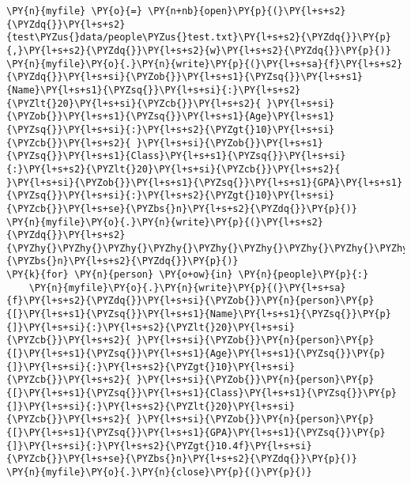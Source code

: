 \begin{tcolorbox}[breakable, size=fbox, boxrule=1pt, pad at break*=1mm,colback=cellbackground, colframe=cellborder]
\begin{Verbatim}[commandchars=\\\{\}]
\PY{n}{myfile} \PY{o}{=} \PY{n+nb}{open}\PY{p}{(}\PY{l+s+s2}{\PYZdq{}}\PY{l+s+s2}{test\PYZus{}data/people\PYZus{}test.txt}\PY{l+s+s2}{\PYZdq{}}\PY{p}{,}\PY{l+s+s2}{\PYZdq{}}\PY{l+s+s2}{w}\PY{l+s+s2}{\PYZdq{}}\PY{p}{)}
\PY{n}{myfile}\PY{o}{.}\PY{n}{write}\PY{p}{(}\PY{l+s+sa}{f}\PY{l+s+s2}{\PYZdq{}}\PY{l+s+si}{\PYZob{}}\PY{l+s+s1}{\PYZsq{}}\PY{l+s+s1}{Name}\PY{l+s+s1}{\PYZsq{}}\PY{l+s+si}{:}\PY{l+s+s2}{\PYZlt{}20}\PY{l+s+si}{\PYZcb{}}\PY{l+s+s2}{ }\PY{l+s+si}{\PYZob{}}\PY{l+s+s1}{\PYZsq{}}\PY{l+s+s1}{Age}\PY{l+s+s1}{\PYZsq{}}\PY{l+s+si}{:}\PY{l+s+s2}{\PYZgt{}10}\PY{l+s+si}{\PYZcb{}}\PY{l+s+s2}{ }\PY{l+s+si}{\PYZob{}}\PY{l+s+s1}{\PYZsq{}}\PY{l+s+s1}{Class}\PY{l+s+s1}{\PYZsq{}}\PY{l+s+si}{:}\PY{l+s+s2}{\PYZlt{}20}\PY{l+s+si}{\PYZcb{}}\PY{l+s+s2}{ }\PY{l+s+si}{\PYZob{}}\PY{l+s+s1}{\PYZsq{}}\PY{l+s+s1}{GPA}\PY{l+s+s1}{\PYZsq{}}\PY{l+s+si}{:}\PY{l+s+s2}{\PYZgt{}10}\PY{l+s+si}{\PYZcb{}}\PY{l+s+se}{\PYZbs{}n}\PY{l+s+s2}{\PYZdq{}}\PY{p}{)}
\PY{n}{myfile}\PY{o}{.}\PY{n}{write}\PY{p}{(}\PY{l+s+s2}{\PYZdq{}}\PY{l+s+s2}{\PYZhy{}\PYZhy{}\PYZhy{}\PYZhy{}\PYZhy{}\PYZhy{}\PYZhy{}\PYZhy{}\PYZhy{}\PYZhy{}\PYZhy{}\PYZhy{}\PYZhy{}\PYZhy{}\PYZhy{}\PYZhy{}\PYZhy{}\PYZhy{}\PYZhy{}\PYZhy{}\PYZhy{}\PYZhy{}\PYZhy{}\PYZhy{}\PYZhy{}\PYZhy{}\PYZhy{}\PYZhy{}\PYZhy{}\PYZhy{}\PYZhy{}\PYZhy{}\PYZhy{}\PYZhy{}\PYZhy{}\PYZhy{}\PYZhy{}\PYZhy{}\PYZhy{}\PYZhy{}\PYZhy{}\PYZhy{}\PYZhy{}\PYZhy{}\PYZhy{}\PYZhy{}\PYZhy{}\PYZhy{}\PYZhy{}\PYZhy{}\PYZhy{}\PYZhy{}\PYZhy{}\PYZhy{}\PYZhy{}\PYZhy{}\PYZhy{}\PYZhy{}\PYZhy{}\PYZhy{}\PYZhy{}\PYZhy{}\PYZhy{}}\PY{l+s+se}{\PYZbs{}n}\PY{l+s+s2}{\PYZdq{}}\PY{p}{)}
\PY{k}{for} \PY{n}{person} \PY{o+ow}{in} \PY{n}{people}\PY{p}{:}
    \PY{n}{myfile}\PY{o}{.}\PY{n}{write}\PY{p}{(}\PY{l+s+sa}{f}\PY{l+s+s2}{\PYZdq{}}\PY{l+s+si}{\PYZob{}}\PY{n}{person}\PY{p}{[}\PY{l+s+s1}{\PYZsq{}}\PY{l+s+s1}{Name}\PY{l+s+s1}{\PYZsq{}}\PY{p}{]}\PY{l+s+si}{:}\PY{l+s+s2}{\PYZlt{}20}\PY{l+s+si}{\PYZcb{}}\PY{l+s+s2}{ }\PY{l+s+si}{\PYZob{}}\PY{n}{person}\PY{p}{[}\PY{l+s+s1}{\PYZsq{}}\PY{l+s+s1}{Age}\PY{l+s+s1}{\PYZsq{}}\PY{p}{]}\PY{l+s+si}{:}\PY{l+s+s2}{\PYZgt{}10}\PY{l+s+si}{\PYZcb{}}\PY{l+s+s2}{ }\PY{l+s+si}{\PYZob{}}\PY{n}{person}\PY{p}{[}\PY{l+s+s1}{\PYZsq{}}\PY{l+s+s1}{Class}\PY{l+s+s1}{\PYZsq{}}\PY{p}{]}\PY{l+s+si}{:}\PY{l+s+s2}{\PYZlt{}20}\PY{l+s+si}{\PYZcb{}}\PY{l+s+s2}{ }\PY{l+s+si}{\PYZob{}}\PY{n}{person}\PY{p}{[}\PY{l+s+s1}{\PYZsq{}}\PY{l+s+s1}{GPA}\PY{l+s+s1}{\PYZsq{}}\PY{p}{]}\PY{l+s+si}{:}\PY{l+s+s2}{\PYZgt{}10.4f}\PY{l+s+si}{\PYZcb{}}\PY{l+s+se}{\PYZbs{}n}\PY{l+s+s2}{\PYZdq{}}\PY{p}{)}
\PY{n}{myfile}\PY{o}{.}\PY{n}{close}\PY{p}{(}\PY{p}{)}
\end{Verbatim}
\end{tcolorbox}

